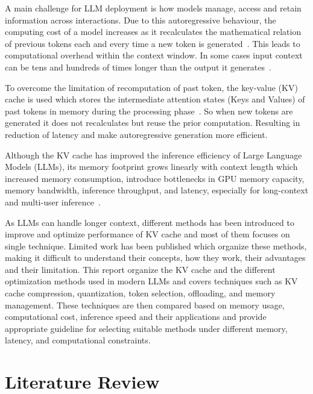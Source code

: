 \documentclass[conference]{IEEEtran}
\begin{document}
A main challenge for LLM deployment is how models manage, access and retain information across interactions. Due to this autoregressive behaviour, the computing cost of a model increases as it recalculates the mathematical relation of previous tokens each and every time a new token is generated~\cite{nvidia2025nvfp4}. This leads to computational overhead within the context window. In some cases input context can be tens and hundreds of times longer than the output it generates~\cite{lu2026mixquant}.

To overcome the limitation of recomputation of past token, the key-value (KV) cache is used which stores the intermediate attention states (Keys and Values) of past tokens in memory during the processing  phase~\cite{xu2026kv}. So when new tokens are generated it does not recalculates but reuse the prior computation. Resulting in reduction of latency and make autoregressive generation more efficient.

Although the KV cache has improved the inference efficiency of Large Language Models (LLMs), its memory footprint grows linearly with context length which increased memory consumption, introduce bottlenecks in GPU memory capacity, memory bandwidth, inference throughput, and latency, especially for long-context and multi-user inference~\cite{xu2026kv}.

As LLMs can handle longer context, different methods has been introduced to improve and optimize performance of KV cache and most of them focuses on single technique. Limited work has been published which organize these methods, making it difficult to understand their concepts, how they work, their advantages and their limitation. This report organize the KV cache and the different optimization methods used in modern LLMs and covers techniques such as KV cache compression, quantization, token selection, offloading, and memory management. These techniques are then compared based on memory usage, computational cost, inference speed and their applications and provide appropriate guideline for selecting suitable methods under different memory, latency, and computational constraints.
\section{Literature Review}
\end{document}

